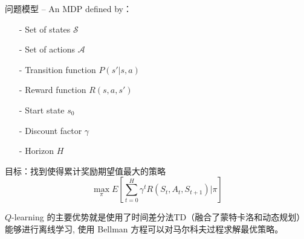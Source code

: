 问题模型 -- An MDP defined by：
\begin{itemize}
\setlength{\parskip}{0pt}
\item[-]
Set of states $\mathcal{S}$

\item[-]
Set of actions $\mathcal{A}$

\item[-]
Transition function $P(s'|s, a)$

\item[-]
Reward function $R(s,a,s')$

\item[-]
Start state $s_0$

\item[-]
Discount factor $\gamma$

\item[-]
Horizon $H$

\end{itemize}


目标：找到使得累计奖励期望值最大的策略
$$
\max_\pi E\left[ \sum_{t=0}^H \gamma^t R(S_t, A_t, S_{t+1}) | \pi \right]
$$

$Q$-learning 的主要优势就是使用了时间差分法TD（融合了蒙特卡洛和动态规划）能够进行离线学习, 
使用 Bellman 方程可以对马尔科夫过程求解最优策略。






